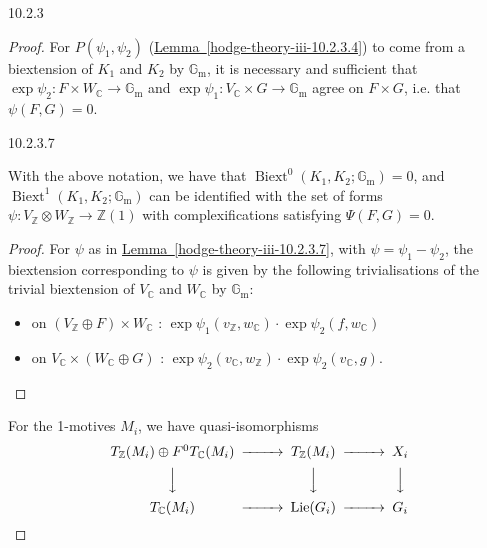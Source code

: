 \begin{construction}{10.2.3}
\begin{proof}
        For \(P(\psi _1,\psi _2)\) (\hyperref[hodge-theory-iii-10.2.3.4]{Lemma~\ref*{hodge-theory-iii-10.2.3.4}}) to come from a biextension of \(K_1\) and \(K_2\) by \(\mathbb {G}_\mathrm {m}\), it is necessary and sufficient that \(\exp \psi _2\colon  F\times  W_\mathbb {C}\to \mathbb {G}_\mathrm {m}\) and \(\exp \psi _1\colon  V_\mathbb {C}\times  G\to \mathbb {G}_\mathrm {m}\) agree on \(F\times  G\), i.e. that \(\psi (F,G)=0\).\begin{lemma}{10.2.3.7}\label{hodge-theory-iii-10.2.3.7}\skipsinglepar\par{}With the above notation, we have that \(\operatorname {Biext}^0(K_1,K_2;\mathbb {G}_\mathrm {m})=0\), and \(\operatorname {Biext}^1(K_1,K_2;\mathbb {G}_\mathrm {m})\) can be identified with the set of forms \(\psi \colon  V_\mathbb {Z}\otimes  W_\mathbb {Z}\to \mathbb {Z}(1)\) with complexifications satisfying \(\Psi (F,G)=0\).\begin{proof}\par{}For \(\psi \) as in \hyperref[hodge-theory-iii-10.2.3.7]{Lemma~\ref*{hodge-theory-iii-10.2.3.7}}, with \(\psi =\psi _1-\psi _2\), the biextension corresponding to \(\psi \) is given by the following trivialisations of the trivial biextension of \(V_\mathbb {C}\) and \(W_\mathbb {C}\) by \(\mathbb {G}_\mathrm {m}\):
          \begin{itemize}\item{}on \((V_\mathbb {Z}\oplus  F)\times  W_\mathbb {C}\) : \(\exp \psi _1(v_\mathbb {Z},w_\mathbb {C})\cdot \exp \psi _2(f,w_\mathbb {C})\)
            \item{}on \(V_\mathbb {C}\times (W_\mathbb {C}\oplus  G)\) : \(\exp \psi _2(v_\mathbb {C},w_\mathbb {Z})\cdot \exp \psi _2(v_\mathbb {C},g)\).\end{itemize}\end{proof}\end{lemma}\label{hodge-theory-iii-10.2.3.8}\par{}For the 1-motives \(M_i\), we have quasi-isomorphisms
        \[           \begin {CD}             T_\mathbb {Z}(M_i)\oplus  F^0T_\mathbb {C}(M_i) @>>> T_\mathbb {Z}(M_i) @>>> X_i           \\@VVV @VVV @VVV           \\T_\mathbb {C}(M_i) @>>> \operatorname {Lie}(G_i) @>>> G_i           \end {CD}         \]
        

\end{proof}
\end{construction}

